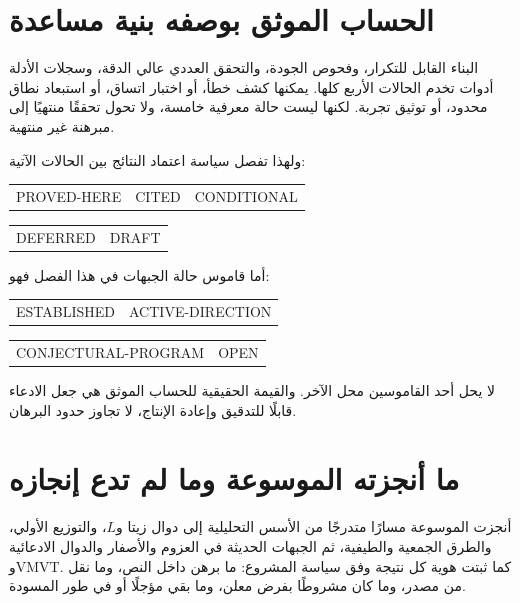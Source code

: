 \section{الحساب الموثق بوصفه بنية مساعدة}

البناء القابل للتكرار، وفحوص الجودة، والتحقق العددي عالي الدقة، وسجلات الأدلة أدوات تخدم الحالات الأربع كلها. يمكنها كشف خطأ، أو اختبار اتساق، أو استبعاد نطاق محدود، أو توثيق تجربة. لكنها ليست حالة معرفية خامسة، ولا تحول تحققًا منتهيًا إلى مبرهنة غير منتهية.

ولهذا تفصل سياسة اعتماد النتائج بين الحالات الآتية:

\begin{center}
\small
\begin{tabular}{ccc}
\textenglish{PROVED-HERE} & \textenglish{CITED} & \textenglish{CONDITIONAL}
\end{tabular}

\smallskip
\begin{tabular}{cc}
\textenglish{DEFERRED} & \textenglish{DRAFT}
\end{tabular}
\end{center}

أما قاموس حالة الجبهات في هذا الفصل فهو:

\begin{center}
\small
\begin{tabular}{cc}
\textenglish{ESTABLISHED} & \textenglish{ACTIVE-DIRECTION}
\end{tabular}

\smallskip
\begin{tabular}{cc}
\textenglish{CONJECTURAL-PROGRAM} & \textenglish{OPEN}
\end{tabular}
\end{center}

لا يحل أحد القاموسين محل الآخر. والقيمة الحقيقية للحساب الموثق هي جعل الادعاء قابلًا للتدقيق وإعادة الإنتاج، لا تجاوز حدود البرهان.

\section{ما أنجزته الموسوعة وما لم تدع إنجازه}

أنجزت الموسوعة مسارًا متدرجًا من الأسس التحليلية إلى دوال زيتا و\(L\)، والتوزيع الأولي، والطرق الجمعية والطيفية، ثم الجبهات الحديثة في العزوم والأصفار والدوال الادعائية وVMVT. كما ثبتت هوية كل نتيجة وفق سياسة المشروع: ما برهن داخل النص، وما نقل من مصدر، وما كان مشروطًا بفرض معلن، وما بقي مؤجلًا أو في طور المسودة.

